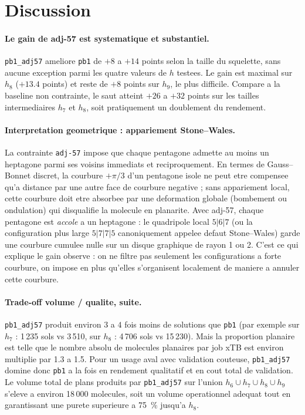 \documentclass[11pt,a4paper]{article}
\begin{document}
\section{Discussion}

\paragraph{Le gain de adj-57 est systematique et substantiel.}
\texttt{pb1\_adj57} ameliore \texttt{pb1} de $+8$ a $+14$ points selon
la taille du squelette, sans aucune exception parmi les quatre valeurs
de $h$ testees. Le gain est maximal sur $h_8$ ($+13.4$ points) et reste
de $+8$ points sur $h_9$, le plus difficile. Compare a la baseline non
contrainte, le saut atteint $+26$ a $+32$ points sur les tailles
intermediaires $h_7$ et $h_8$, soit pratiquement un doublement du
rendement.

\paragraph{Interpretation geometrique : appariement Stone--Wales.}
La contrainte \texttt{adj-57} impose que chaque pentagone admette au
moins un heptagone parmi ses voisins immediats et reciproquement. En
termes de Gauss--Bonnet discret, la courbure $+\pi/3$ d'un pentagone
isole ne peut etre compensee qu'a distance par une autre face de
courbure negative ; sans appariement local, cette courbure doit etre
absorbee par une deformation globale (bombement ou ondulation) qui
disqualifie la molecule en planarite. Avec adj-57, chaque pentagone est
\emph{accole} a un heptagone : le quadripole local $5|6|7$ (ou la
configuration plus large $5|7|7|5$ canoniquement appelee defaut
Stone--Wales) garde une courbure cumulee nulle sur un disque graphique
de rayon 1 ou 2. C'est ce qui explique le gain observe : on ne filtre
pas seulement les configurations a forte courbure, on impose en plus
qu'elles s'organisent localement de maniere a annuler cette courbure.

\paragraph{Trade-off volume / qualite, suite.}
\texttt{pb1\_adj57} produit environ $3$ a $4$ fois moins de solutions
que \texttt{pb1} (par exemple sur $h_7$ : 1\,235 sols vs 3\,510, sur
$h_8$ : 4\,706 sols vs 15\,230). Mais la proportion planaire est telle
que le nombre absolu de molecules planaires par job xTB est environ
multiplie par 1.3 a 1.5. Pour un usage aval avec validation couteuse,
\texttt{pb1\_adj57} domine donc \texttt{pb1} a la fois en rendement
qualitatif et en cout total de validation. Le volume total de plans
produits par \texttt{pb1\_adj57} sur l'union $h_6 \cup h_7 \cup h_8
\cup h_9$ s'eleve a environ 18\,000 molecules, soit un volume
operationnel adequat tout en garantissant une purete superieure a
75~\% jusqu'a $h_8$.
\end{document}
